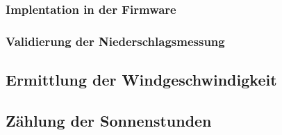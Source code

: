 \subsubsection*{Implentation in der Firmware}
\subsubsection*{Validierung der Niederschlagsmessung}
 
\subsection{Ermittlung der Windgeschwindigkeit}
\subsection{Zählung der Sonnenstunden}
